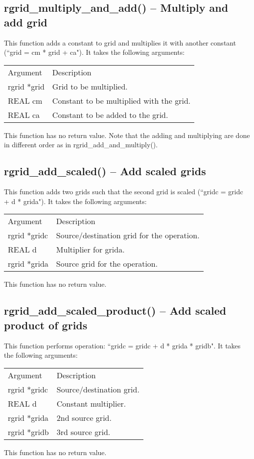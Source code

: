 \documentclass[12pt,letterpaper]{report}
\begin{document}
\subsection{rgrid\_multiply\_and\_add() -- Multiply and add grid}

This function adds a constant to grid and multiplies it with another constant (``grid = cm * grid + ca"). It takes the following arguments:
\begin{longtable}{p{} p{}}
Argument & Description\\
\cline{1-2}
rgrid *grid & Grid to be multiplied.\\
REAL cm & Constant to be multiplied with the grid.\\
REAL ca & Constant to be added to the grid.\\
\end{longtable}
\noindent
This function has no return value. Note that the adding and multiplying are done in different order as in rgrid\_add\_and\_multiply().

\subsection{rgrid\_add\_scaled() -- Add scaled grids}

This function adds two grids such that the second grid is scaled (``gridc = gridc + d * grida"). It takes the following arguments:
\begin{longtable}{p{} p{}}
Argument & Description\\
\cline{1-2}
rgrid *gridc & Source/destination grid for the operation.\\
REAL d & Multiplier for grida.\\
rgrid *grida & Source grid for the operation.\\
\end{longtable}
\noindent
This function has no return value.

\subsection{rgrid\_add\_scaled\_product() -- Add scaled product of grids}

This function performs operation: ``gridc = gridc + d * grida * gridb". It takes the following arguments:
\begin{longtable}{p{} p{}}
Argument & Description\\
\cline{1-2}
rgrid *gridc & Source/destination grid.\\
REAL d & Constant multiplier.\\
rgrid *grida & 2nd source grid.\\
rgrid *gridb & 3rd source grid.\\      
\end{longtable}
\noindent
This function has no return value.
\end{document}
